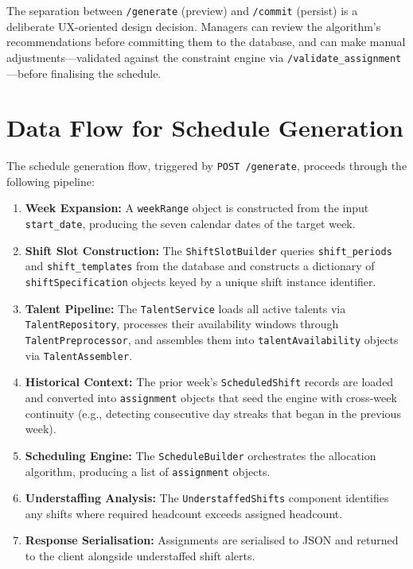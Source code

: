 The separation between \texttt{/generate} (preview) and \texttt{/commit} (persist) is a deliberate UX-oriented design decision. Managers can review the algorithm's recommendations before committing them to the database, and can make manual adjustments—validated against the constraint engine via \texttt{/validate\_assignment}—before finalising the schedule.

\section{Data Flow for Schedule Generation}

The schedule generation flow, triggered by \texttt{POST /generate}, proceeds through the following pipeline:

\begin{enumerate}
    \item \textbf{Week Expansion:} A \texttt{weekRange} object is constructed from the input \texttt{start\_date}, producing the seven calendar dates of the target week.
    \item \textbf{Shift Slot Construction:} The \texttt{ShiftSlotBuilder} queries \texttt{shift\_periods} and \texttt{shift\_templates} from the database and constructs a dictionary of \texttt{shiftSpecification} objects keyed by a unique shift instance identifier.
    \item \textbf{Talent Pipeline:} The \texttt{TalentService} loads all active talents via \texttt{TalentRepository}, processes their availability windows through \texttt{TalentPreprocessor}, and assembles them into \texttt{talentAvailability} objects via \texttt{TalentAssembler}.
    \item \textbf{Historical Context:} The prior week's \texttt{ScheduledShift} records are loaded and converted into \texttt{assignment} objects that seed the engine with cross-week continuity (e.g., detecting consecutive day streaks that began in the previous week).
    \item \textbf{Scheduling Engine:} The \texttt{ScheduleBuilder} orchestrates the allocation algorithm, producing a list of \texttt{assignment} objects.
    \item \textbf{Understaffing Analysis:} The \texttt{UnderstaffedShifts} component identifies any shifts where required headcount exceeds assigned headcount.
    \item \textbf{Response Serialisation:} Assignments are serialised to JSON and returned to the client alongside understaffed shift alerts.
\end{enumerate}


